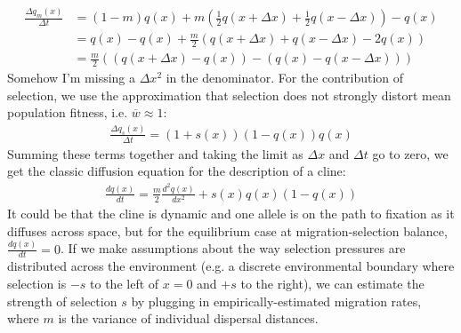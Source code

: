\documentclass{article}
\begin{document}
\begin{align*}
\frac{\Delta q_{m}(x)}{\Delta t} & = (1-m)q(x) + m(\frac{1}{2}q(x + \Delta x) + \frac{1}{2}q(x - \Delta x)) - q(x) \\
& = q(x) - q(x) + \frac{m}{2}\left(q(x + \Delta x) + q(x - \Delta x) - 2q(x)\right) \\
& = \frac{m}{2}\left((q(x + \Delta x) - q(x)) - (q(x) - q(x - \Delta x))\right)
\end{align*}
Somehow I'm missing a $\Delta x^{2}$ in the denominator. \newline
For the contribution of selection, we use the approximation that selection does not strongly distort mean population fitness, i.e. $\overline{w} \approx 1$:
\begin{align*}
\frac{\Delta q_{s}(x)}{\Delta t} = (1+s(x))(1-q(x))q(x)
\end{align*}
Summing these terms together and taking the limit as $\Delta x$ and $\Delta t$ go to zero, we get the classic diffusion equation for the description of a cline:
\begin{align}
\frac{dq(x)}{dt} = \frac{m}{2}\frac{d^{2}q(x)}{dx^2} + s(x)q(x)(1-q(x))
\end{align}
It could be that the cline is dynamic and one allele is on the path to fixation as it diffuses across space, but for the equilibrium case at migration-selection balance, $\frac{dq(x)}{dt} = 0$. If we make assumptions about the way selection pressures are distributed across the environment (e.g. a discrete environmental boundary where selection is $-s$ to the left of $x=0$ and $+s$ to the right), we can estimate the strength of selection $s$ by plugging in empirically-estimated migration rates, where $m$ is the variance of individual dispersal distances.
\end{document}
